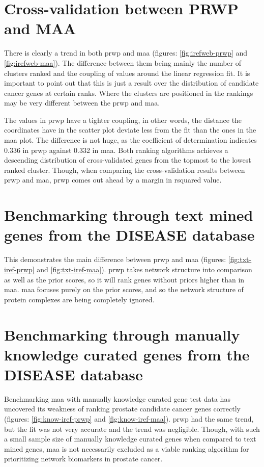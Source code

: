 \section{Cross-validation between PRWP and MAA}
There is clearly a trend in both \gls{prwp} and \gls{maa} (figures:
\ref{fig:irefweb-prwp} and \ref{fig:irefweb-maa}). The difference between them
being mainly the number of clusters ranked and the coupling of values around the
linear regression fit. It is important to point out that this is just a result
over the distribution of candidate cancer genes at certain ranks. Where the
clusters are positioned in the rankings may be very different between the
\gls{prwp} and \gls{maa}.

The values in \gls{prwp} have a tighter coupling, in other words, the distance
the coordinates have in the scatter plot deviate less from the fit than the ones
in the \gls{maa} plot. The difference is not huge, as the coefficient of
determination indicates 0.336 in \gls{prwp} against 0.332 in \gls{maa}. Both
ranking algorithms achieves a descending distribution of cross-validated genes
from the topmost to the lowest ranked cluster. Though, when comparing the
cross-validation results between \gls{prwp} and \gls{maa}, \gls{prwp} comes out
ahead by a margin in \gls{rsquared} value.

\section{Benchmarking through text mined genes from the DISEASE database}
This demonstrates the main difference between \gls{prwp} and \gls{maa} (figures:
\ref{fig:txt-iref-prwp} and \ref{fig:txt-iref-maa}).  \gls{prwp} takes network
structure into comparison as well as the prior scores, so it will rank genes
without priors higher than in \gls{maa}. \gls{maa} focuses purely on the prior
scores, and so the network structure of protein complexes are being completely
ignored.

\section{Benchmarking through manually knowledge curated genes from the DISEASE database}
Benchmarking \gls{maa} with manually knowledge curated gene test data has
uncovered its weakness of ranking prostate candidate cancer genes correctly
(figures: \ref{fig:know-iref-prwp} and \ref{fig:know-iref-maa}).
\gls{prwp} had the same trend, but the fit was not very accurate and the trend
was negligible. Though, with such a small sample size of manually knowledge
curated genes when compared to text mined genes, \gls{maa} is not necessarily
excluded as a viable ranking algorithm for prioritizing network biomarkers in
prostate cancer.

